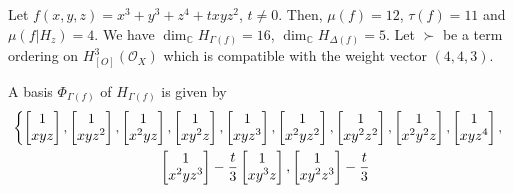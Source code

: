 \documentclass[pdftex]{sigma}%
\numberwithin{equation}{section}
\begin{document}
\begin{Example}
Let $f(x,y,z) = x^3+y^3+z^4+txyz^2$, $t\ne 0$. Then, $\mu(f)=12$, $\tau(f)=11$ and $\mu(f|H_{z})=4$.
We have $\dim_{{\mathbb C}}H_{\Gamma(f)} = 16$, $\dim_{{\mathbb C}}H_{\Delta(f)}=5$.
Let $\succ$ be a term ordering on $H_{[O]}^{3}({\mathcal O}_X)$ which is compatible with
the weight vector $(4,4,3)$.

A basis $\Phi_{{\Gamma(f)}}$ of $H_{{\Gamma(f)}}$ is given by
\begin{gather*}
\left\{
\begin{bmatrix} 1 \\ x y z \end{bmatrix},
\begin{bmatrix} 1 \\ x y z^{2} \end{bmatrix},
\begin{bmatrix} 1 \\ x^2 y z \end{bmatrix},
\begin{bmatrix} 1 \\ x y^2 z \end{bmatrix},
\begin{bmatrix} 1 \\ x y z^{3} \end{bmatrix},
\begin{bmatrix} 1 \\ x^{2} y z^{2} \end{bmatrix},
\begin{bmatrix} 1 \\ x y^{2} z^{2} \end{bmatrix},
\begin{bmatrix} 1 \\ x^{2} y^{2} z \end{bmatrix},
\begin{bmatrix} 1 \\ x y z^{4}\end{bmatrix},\right.
\\
\hphantom{\left\{\right.}
\begin{bmatrix} 1 \\ x^{2} y z^{3} \end{bmatrix} -\dfrac{t}{3}
\begin{bmatrix} 1 \\ x y^{3} z\end{bmatrix},
\begin{bmatrix} 1 \\ x y^{2} z^{3} \end{bmatrix} -\dfrac{t}{3}

\end{gather*}
\end{Example}
\end{document}
